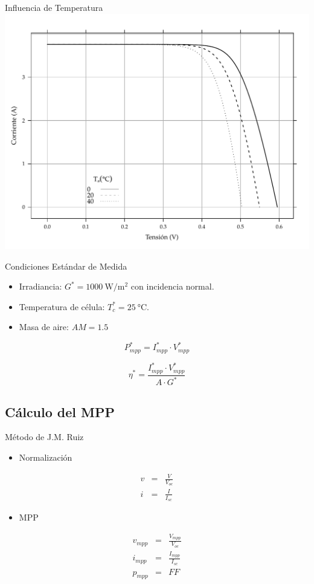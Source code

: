 \documentclass[xcolor={usenames,svgnames,dvipsnames}]{beamer}
\begin{document}
\begin{frame}[label=sec-3-3-4]{Influencia de Temperatura}
\includegraphics[width=.9\linewidth]{../figs/CurvaIV_G800.pdf}
\end{frame}

\begin{frame}[label=sec-3-3-5]{Condiciones Estándar de Medida}
\begin{itemize}
\item Irradiancia: $G^{*}=\SI{1000}{\watt\per\meter\squared}$ con
incidencia normal.

\item Temperatura de célula: $T_{c}^{*}=\SI{25}{\celsius}$.

\item Masa de aire: $AM=1.5$
\end{itemize}

$$P_{mpp}^{*}=I_{mpp}^{*}\cdot V_{mpp}^{*}$$

$$\eta^{*}=\frac{I_{mpp}^{*}\cdot V_{mpp}^{*}}{A\cdot G^{*}}$$
\end{frame}

\subsection{Cálculo del MPP}
\label{sec-3-4}

\begin{frame}[label=sec-3-4-1]{Método de J.M. Ruiz}
\begin{itemize}
\item Normalización
\end{itemize}

$$\begin{aligned}
  v & = & \frac{V}{V_{oc}}\\
  i & = & \frac{I}{I_{sc}}\end{aligned}$$

\begin{itemize}
\item MPP
\end{itemize}

$$\begin{aligned}
  v_{mpp} & = & \frac{V_{mpp}}{V_{oc}}\\
  i_{mpp} & = & \frac{I_{mpp}}{I_{sc}}\\
  p_{mpp} & = & FF\end{aligned}$$
\end{frame}
\end{document}
